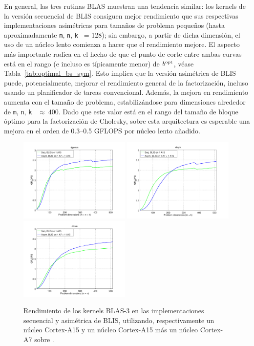 En general, las tres rutinas BLAS muestran una tendencia similar: los kernels de la versión secuencial de BLIS
consiguen mejor rendimiento que sus respectivas implementaciones asimétricas para tamaños de problema pequeños (hasta
aproximadamente {\tt m}, {\tt n}, {\tt k } = 128); sin embargo, 
a partir de dicha dimensión, el uso de un núcleo lento comienza a hacer que el rendimiento mejore. 
El aspecto más importante radica en el hecho de que el punto de corte entre ambas curvas está en el rango (e incluso 
es típicamente menor) de $b^{\mbox{\rm \scriptsize opt}}$, véase Tabla~\ref{tab:optimal_bs_sym}. 
Esto implica que la versión asimétrica de BLIS puede, potencialmente, mejorar el rendimiento general de la factorización, 
incluso usando un planificador de tareas convencional.
Además, la mejora en rendimiento aumenta con el tamaño de problema, estabilizándose para dimensiones alrededor de 
{\tt m}, {\tt n}, {\tt k } $\approx~400$. Dado que este valor está en el rango del tamaño de bloque óptimo para
la factorización de Cholesky, sobre esta arquitectura es esperable una mejora en el orden de 0.3--0.5 GFLOPS por núcleo lento
añadido.

\begin{figure}[t]
\centering
\includegraphics[width=0.49\textwidth]{Plots/BLIS_small/blis_dgemm_sym_asym}
\includegraphics[width=0.49\textwidth]{Plots/BLIS_small/blis_dsyrk_sym_asym}
\includegraphics[width=0.49\textwidth]{Plots/BLIS_small/blis_dtrsm_sym_asym}
\caption{Rendimiento de los kernels BLAS-3 en las implementaciones secuencial y asimétrica de BLIS, utilizando, respectivamente
         un núcleo Cortex-A15 y un núcleo Cortex-A15 más un núcleo Cortex-A7 sobre \odroid.}
\label{fig:cross_blis}
\end{figure}


